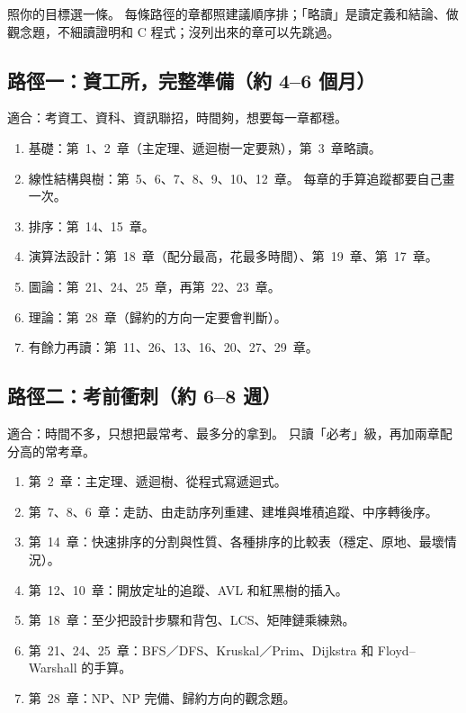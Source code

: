 照你的目標選一條。 每條路徑的章都照建議順序排；「略讀」是讀定義和結論、做觀念題，不細讀證明和 C 程式；沒列出來的章可以先跳過。

\subsection*{路徑一：資工所，完整準備（約 4--6 個月）}

適合：考資工、資科、資訊聯招，時間夠，想要每一章都穩。

\begin{enumerate}
\item 基礎：第~1、2~章（主定理、遞迴樹一定要熟），第~3~章略讀。
\item 線性結構與樹：第~5、6、7、8、9、10、12~章。 每章的手算追蹤都要自己畫一次。
\item 排序：第~14、15~章。
\item 演算法設計：第~18~章（配分最高，花最多時間）、第~19~章、第~17~章。
\item 圖論：第~21、24、25~章，再第~22、23~章。
\item 理論：第~28~章（歸約的方向一定要會判斷）。
\item 有餘力再讀：第~11、26、13、16、20、27、29~章。
\end{enumerate}

\subsection*{路徑二：考前衝刺（約 6--8 週）}

適合：時間不多，只想把最常考、最多分的拿到。 只讀「必考」級，再加兩章配分高的常考章。

\begin{enumerate}
\item 第~2~章：主定理、遞迴樹、從程式寫遞迴式。
\item 第~7、8、6~章：走訪、由走訪序列重建、建堆與堆積追蹤、中序轉後序。
\item 第~14~章：快速排序的分割與性質、各種排序的比較表（穩定、原地、最壞情況）。
\item 第~12、10~章：開放定址的追蹤、AVL 和紅黑樹的插入。
\item 第~18~章：至少把設計步驟和背包、LCS、矩陣鏈乘練熟。
\item 第~21、24、25~章：BFS／DFS、Kruskal／Prim、Dijkstra 和 Floyd--Warshall 的手算。
\item 第~28~章：NP、NP 完備、歸約方向的觀念題。
\end{enumerate}

